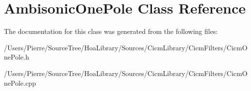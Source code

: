 \hypertarget{class_ambisonic_one_pole}{\section{Ambisonic\-One\-Pole Class Reference}
\label{class_ambisonic_one_pole}
}


The documentation for this class was generated from the following files\-:\begin{DoxyCompactItemize}
\item 
/\-Users/\-Pierre/\-Source\-Tree/\-Hoa\-Library/\-Sources/\-Cicm\-Library/\-Cicm\-Filters/Cicm\-One\-Pole.\-h\item 
/\-Users/\-Pierre/\-Source\-Tree/\-Hoa\-Library/\-Sources/\-Cicm\-Library/\-Cicm\-Filters/Cicm\-One\-Pole.\-cpp\end{DoxyCompactItemize}
